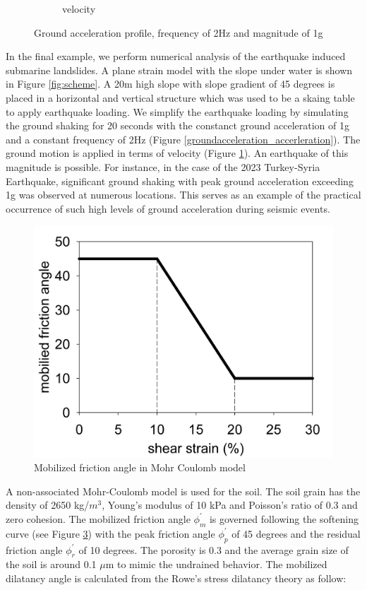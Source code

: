 \documentclass[preprint,12pt]{elsarticle}
\begin{document}
\begin{figure}[H]
\begin{subfigure}[d]{0.5\linewidth}
\caption{velocity}
\label{groundacceleration_velocity}
\end {subfigure}
\caption{Ground acceleration profile, frequency of 2Hz and magnitude of 1g}
\label{groundacceleration}
\end {figure}
In the final example, we perform numerical analysis of the earthquake induced submarine landslides. A plane strain model with the slope under water is shown in Figure \ref{fig:scheme}. A 20m high slope with slope gradient of 45 degrees is placed in a horizontal and vertical structure which was used to be a skaing table to apply earthquake loading. We simplify the earthquake loading by simulating the ground shaking for 20 seconds with the constanct ground acceleration of 1g and a constant frequency of 2Hz (Figure \ref{groundacceleration_accerleration}). The ground motion is applied in terms of velocity (Figure \ref{groundacceleration_velocity}). An earthquake of this magnitude is possible. For instance, in the case of the 2023 Turkey-Syria Earthquake, significant ground shaking with peak ground acceleration exceeding 1g was observed at numerous locations. This serves as an example of the practical occurrence of such high levels of ground acceleration during seismic events. \\
%
%
\begin{figure}[H]
\center
\includegraphics[scale=0.25]{model.jpg}
\caption{Mobilized friction angle in Mohr Coulomb model}
\label{fig:model}
\end {figure}
%
%
A non-associated Mohr-Coulomb model is used for the soil. The soil grain has the density of 2650 kg/$m^3$, Young's modulus of 10 kPa and Poisson's ratio of 0.3 and zero cohesion. The mobilized friction angle $\phi^\prime_m$ is governed following the softening curve (see Figure \ref{fig:model}) with the peak friction angle $\phi^\prime_p$ of 45 degrees and the residual friction angle $\phi^\prime_r$ of 10 degrees. The porosity is 0.3 and the average grain size of the soil is around 0.1 $\mu$m to mimic the undrained behavior. The mobilized dilatancy angle is calculated from the Rowe's stress dilatancy theory  \cite{Wood} as follow:
\end{document}

